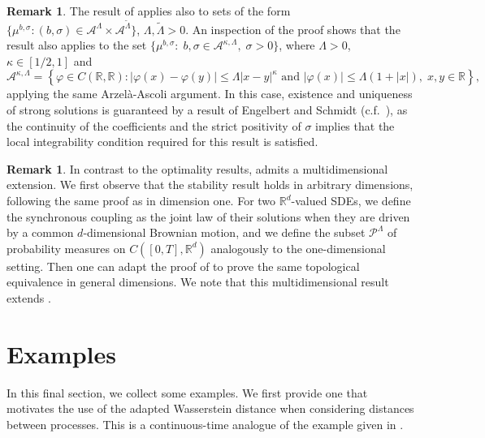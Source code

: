 \documentclass[oneside]{amsart}
\theoremstyle{definition}
\newtheorem{remark}[theorem]{Remark}
\newcommand{\R}{\mathbb R}
\newcommand{\A}{\mathcal A}
\newcommand{\Pc}{\mathcal P}
\def\R{{\mathbb R}}
\numberwithin{equation}{section}
\begin{document}
\begin{remark}
	The result of  applies also to sets of the form $\{
	\mu^{b,\sigma}\colon (b,\sigma)\in\A^\Lambda\times\A^{\tilde\Lambda}
	\}$, $\Lambda,\tilde\Lambda>0$. 
	An inspection of the proof shows that the result also applies to the set $\{\mu^{b,\sigma}\colon \; b,\sigma\in\A^{\kappa,\Lambda}, \; \sigma>0\}$, where $\Lambda>0$, $\kappa\in[1/2,1]$ and 
$$\A^{\kappa,\Lambda}
=
\!\left\{\varphi\in C(\R,\R)\colon 
|\varphi(x)-\varphi(y)|\le \Lambda |x-y|^\kappa
\textrm{ and }
|\varphi(x)|\le \Lambda(1 + | x|),
\;x,y\in\R
\right\},$$
applying the same Arzel{\`a}-Ascoli argument. In this case, existence and uniqueness of strong solutions is guaranteed by a result of Engelbert and Schmidt \cite[Proposition~1.11]{ChEn05} (c.f.\ ), as the continuity of the coefficients and the strict positivity of $\sigma$ implies that the local integrability condition required for this result is satisfied.
\end{remark}

\begin{remark}\label{rem:multidim-topo}
	In contrast to the optimality results,  admits a multidimensional extension. We first observe that the stability result  holds in arbitrary dimensions, following the same proof as in dimension one. For two $\R^d$-valued SDEs, we define the synchronous coupling as the joint law of their solutions when they are driven by a common $d$-dimensional Brownian motion, and we define the subset  $\Pc^\Lambda$ of probability measures on $C([0, T], \R^d)$ analogously to the one-dimensional setting. Then one can adapt the proof of  to prove the same topological equivalence in general dimensions. We note that this multidimensional result extends \cite[Propositions 1.8 and 1.9]{BiTa19}.
\end{remark}

\section{Examples}\label{sec:discussion}
	In this final section, we collect some examples. We first provide one that motivates the use of the adapted Wasserstein distance when considering distances between processes. This is a continuous-time analogue of the example given in \cite{BaBaBeEd19a}.
	
\end{document}
